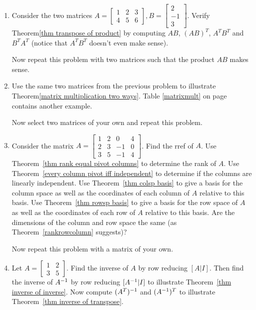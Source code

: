 \begin{enumerate}
\begin{enumerate}
	\item Consider the two matrices 
	$A=
	\begin{bmatrix}
	 1 & 2 & 3\\
	 4 & 5 & 6
	\end{bmatrix}
	, 
	B=
	\begin{bmatrix}
	 2\\-1\\3
	\end{bmatrix}$. Verify Theorem\ref{thm transpose of product}  by computing $AB$, $(AB)^T$, $A^TB^T$ and $B^TA^T$ (notice that $A^TB^T$ doesn't even make sense). 
	
	Now repeat this problem with two matrices such that the product $AB$ makes sense.
	
	
	\item Use the same two matrices from the previous problem to illustrate Theorem\ref{matrix multiplication two ways}. Table \ref{matrixmult} on page \pageref{matrixmult} contains another example.  
	
	Now select two matrices of your own and repeat this problem.
	
	
	
	\item Consider the matrix $A=\begin{bmatrix}
	1 & 2 & 0 & 4 \\
	2 & 3 & -1 & 0\\
	3 & 5 & -1 & 4	
	\end{bmatrix}$. Find the rref of $A$. Use Theorem~\ref{thm rank equal pivot columns} to determine the rank of $A$. Use Theorem~\ref{every column pivot iff independent} to determine if the columns are linearly independent. Use Theorem~\ref{thm colsp basis} to give a basis for the column space as well as the coordinates of each column of $A$ relative to this basis.  Use Theorem~\ref{thm rowsp basis} to give a basis for the row space of $A$ as well as the coordinates of each row of $A$ relative to this basis. Are the dimensions of the column and row space the same (as Theorem~\ref{rankrowcolumn} suggests)? 
	
	Now repeat this problem with a matrix of your own. 
	
  \item Let 
  $A=\begin{bmatrix}
	1 & 2 \\
	3 & 5
	\end{bmatrix}$.  
	Find the inverse of $A$ by row reducing $[A|I]$.  
	Then find the inverse of $A^{-1}$ by row reducing $[A^{-1}|I]$ to illustrate Theorem~\ref{thm inverse of inverse}.  
	Now compute $(A^T)^{-1}$ and $(A^{-1})^T$ to illustrate Theorem~\ref{thm inverse of transpose}.
	

\end{enumerate}
\end{enumerate}
